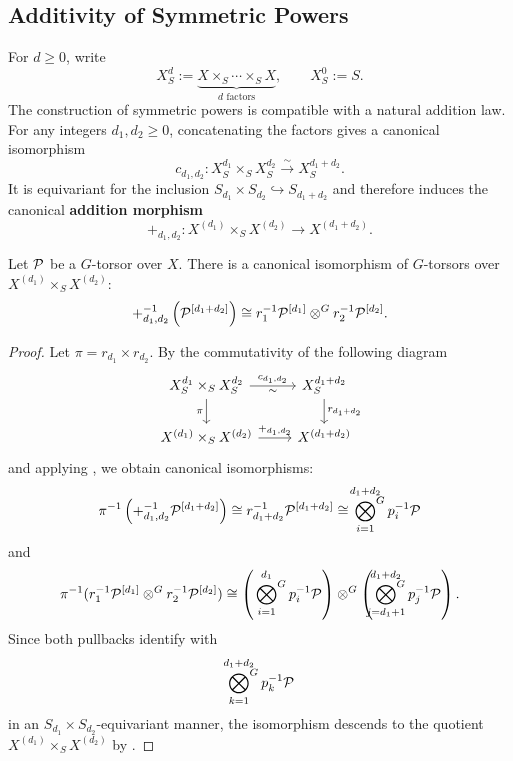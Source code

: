 %
%
\subsection*{Additivity of Symmetric Powers}
For $d\geq 0$, write
\[
X_S^d:=\underbrace{X\times_S\cdots\times_S X}_{d\text{ factors}},
\qquad X_S^0:=S.
\]
The construction of symmetric powers is compatible with a natural addition
law. For any integers $d_1,d_2\geq 0$, concatenating the factors gives a
canonical isomorphism
\[
c_{d_1,d_2}:X_S^{d_1}\times_S X_S^{d_2}
\xrightarrow{\sim}X_S^{d_1+d_2}.
\]
It is equivariant for the inclusion
$S_{d_1}\times S_{d_2}\hookrightarrow S_{d_1+d_2}$ and therefore induces
the canonical \textbf{addition morphism}
\[
+_{d_1,d_2}:X^{(d_1)}\times_S X^{(d_2)}
\longrightarrow X^{(d_1+d_2)}.
\]

\begin{prop}\label{prop:symmetric_powers_on_curves}
    Let $\mathcal{P}$ be a $G$-torsor over $X$. There is a canonical isomorphism of $G$-torsors over $X^{(d_1)} \times_S X^{(d_2)}$:
    \[
    +_{d_1, d_2}^{-1} \left( \mathcal{P}^{[d_1+d_2]} \right) \cong r_1^{-1} \mathcal{P}^{[d_1]} \otimes^G r_2^{-1} \mathcal{P}^{[d_2]}.
    \]
\end{prop}
\begin{proof}
Let $\pi = r_{d_1} \times r_{d_2}$. By the commutativity of the following diagram
\[
\begin{tikzcd}
X_S^{d_1}\times_S X_S^{d_2} \arrow[r, "c_{d_1,d_2}", "\sim"'] \arrow[d, "\pi"'] & X_S^{d_1+d_2} \arrow[d, "r_{d_1+d_2}"] \\
X^{(d_1)} \times_S X^{(d_2)} \arrow[r, "+_{d_1, d_2}"] & X^{(d_1+d_2)}
\end{tikzcd}
\]
and applying , we obtain canonical isomorphisms:
\[
\pi^{-1} \left( +_{d_1, d_2}^{-1} \mathcal{P}^{[d_1+d_2]} \right) \cong r_{d_1+d_2}^{-1} \mathcal{P}^{[d_1+d_2]} \cong \sideset{}{^G}\bigotimes_{i=1}^{d_1+d_2} p_i^{-1} \mathcal{P}
\]
and
\[
\pi^{-1} (r_1^{-1} \mathcal{P}^{[d_1]} \otimes^G r_2^{-1} \mathcal{P}^{[d_2]}) \cong \left( \sideset{}{^G}\bigotimes_{i=1}^{d_1} p_i^{-1} \mathcal{P} \right) \otimes^G \left( \sideset{}{^G}\bigotimes_{j=d_1+1}^{d_1+d_2} p_j^{-1} \mathcal{P} \right).
\]
Since both pullbacks identify with
\[
\sideset{}{^G}\bigotimes_{k=1}^{d_1+d_2} p_k^{-1} \mathcal{P}
\]
in an $S_{d_1} \times S_{d_2}$-equivariant manner, the isomorphism descends to the quotient $X^{(d_1)} \times_S X^{(d_2)}$ by .
\end{proof}

